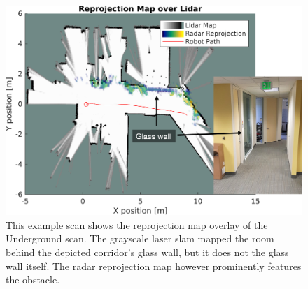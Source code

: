 \begin{figure}[htbp]
    \centering
    \includegraphics[max width=\textwidth]{gfx/diagrams/pres4.png}
    \caption{This example scan shows the reprojection map overlay of the Underground scan. The grayscale laser slam mapped the room behind the depicted corridor's glass wall, but it does not the glass wall itself. The radar reprojection map however prominently features the obstacle.}
    \label{fig:pres4}
\end{figure}
